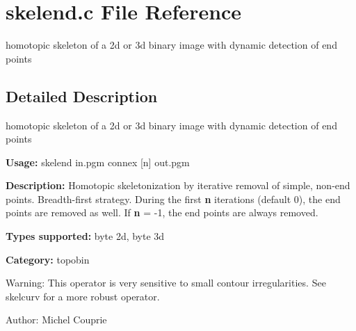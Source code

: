 \section{skelend.c File Reference}
\label{skelend_8c}
homotopic skeleton of a 2d or 3d binary image with dynamic detection of end points  




\label{_details}
\subsection{Detailed Description}
homotopic skeleton of a 2d or 3d binary image with dynamic detection of end points 

{\bf Usage:} skelend in.pgm connex [n] out.pgm

{\bf Description:} Homotopic skeletonization by iterative removal of simple, non-end points. Breadth-first strategy. During the first {\bf n} iterations (default 0), the end points are removed as well. If {\bf n} = -1, the end points are always removed.

{\bf Types supported:} byte 2d, byte 3d

{\bf Category:} topobin

\begin{Desc}
\item[Warning:]This operator is very sensitive to small contour irregularities. See skelcurv for a more robust operator.\end{Desc}
\begin{Desc}
\item[Author:]Michel Couprie \end{Desc}

